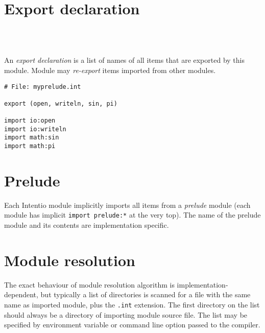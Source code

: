 \section{Export declaration}

\begin{bnf}
   \eq {} \ \term{(} \  \ \term{)} \\
   \eq {} \  \ \gtry{\term{,}}
\end{bnf}

An \emph{export declaration} is a list of names of all items that are exported by this module. Module may \emph{re-export} items imported from other modules.

\begin{example}[Re-exporting]
\begin{lstlisting}
# File: myprelude.int

export (open, writeln, sin, pi)

import io:open
import io:writeln
import math:sin
import math:pi
\end{lstlisting}
\end{example}

\section{Prelude}

Each Intentio module implicitly imports all items from a \emph{prelude} module (each module has implicit \lstinline{import prelude:*} at the very top). The name of the prelude module and its contents are implementation specific.

\section{Module resolution}

The exact behaviour of module resolution algorithm is implementation-dependent, but typically a list of directories is scanned for a file with the same name as imported module, plus the \lstinline{.int} extension. The first directory on the list should always be a directory of importing module source file. The list may be specified by environment variable or command line option passed to the compiler.
